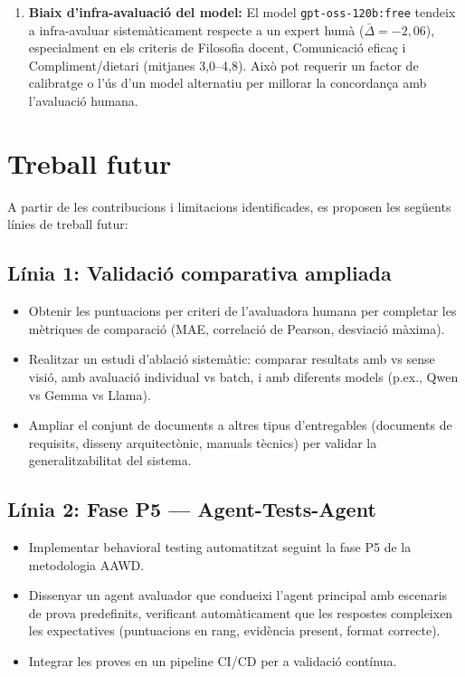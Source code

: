 \documentclass[12pt,a4paper,twoside]{report}
\begin{document}
\begin{enumerate}
    \item \textbf{Biaix d'infra-avaluaci\'o del model:} El model \texttt{gpt-oss-120b:free} tendeix a infra-avaluar sistem\`aticament respecte a un expert hum\`a ($\bar{\Delta} = -2,06$), especialment en els criteris de Filosofia docent, Comunicaci\'o efica\c{c} i Compliment/dietari (mitjanes 3,0--4,8). Aix\`o pot requerir un factor de calibratge o l'\'us d'un model alternatiu per millorar la concordan\c{c}a amb l'avaluaci\'o humana.
\end{enumerate}

\section{Treball futur}
\label{sec:treball-futur}

A partir de les contribucions i limitacions identificades, es proposen les seg\"uents l\'inies de treball futur:

\subsection{L\'inia 1: Validaci\'o comparativa ampliada}

\begin{itemize}
    \item Obtenir les puntuacions per criteri de l'avaluadora humana per completar les m\`etriques de comparaci\'o (MAE, correlaci\'o de Pearson, desviaci\'o m\`axima).
    \item Realitzar un estudi d'ablaci\'o sistem\`atic: comparar resultats amb vs sense visi\'o, amb avaluaci\'o individual vs batch, i amb diferents models (p.ex., Qwen vs Gemma vs Llama).
    \item Ampliar el conjunt de documents a altres tipus d'entregables (documents de requisits, disseny arquitect\`onic, manuals t\`ecnics) per validar la generalitzabilitat del sistema.
\end{itemize}

\subsection{L\'inia 2: Fase P5 --- Agent-Tests-Agent}

\begin{itemize}
    \item Implementar behavioral testing automatitzat seguint la fase P5 de la metodologia AAWD.
    \item Dissenyar un agent avaluador que condueixi l'agent principal amb escenaris de prova predefinits, verificant autom\`aticament que les respostes compleixen les expectatives (puntuacions en rang, evid\`encia present, format correcte).
    \item Integrar les proves en un pipeline CI/CD per a validaci\'o cont\'inua.
\end{itemize}
\end{document}
